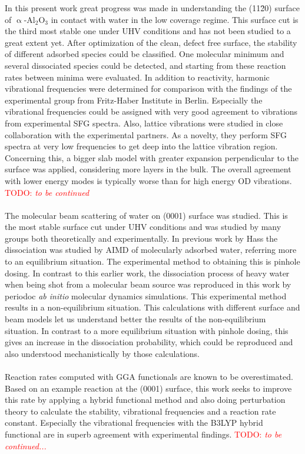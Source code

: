 \documentclass[11pt,DIV=13,BCOR=5mm,a4paper,headinclude]{scrbook}
\newcommand\todo[1]{\textcolor{red}{TODO: \textit{{#1}}}}
\begin{document}

In this present work great progress was made in understanding the (11\=20) surface of $\upalpha$-Al$_2$O$_3$ in contact with water in the low coverage regime.
This surface cut is the third most stable one under UHV conditions and has not been studied to a great extent yet.
After optimization of the clean, defect free surface, the stability of different adsorbed species could be classified.
One molecular minimum and several dissociated species could be detected, and starting from these reaction rates between minima were evaluated.
In addition to reactivity, harmonic vibrational frequencies were determined for comparison with the findings of the experimental group from Fritz-Haber Institute in Berlin.
Especially the vibrational frequencies could be assigned with very good agreement to vibrations from experimental SFG spectra.
Also, lattice vibrations were studied in close collaboration with the experimental partners.
As a novelty, they perform SFG spectra at very low frequencies to get deep into the lattice vibration region.
Concerning this, a bigger slab model with greater expansion perpendicular to the surface was applied, considering more layers in the bulk.
The overall agreement with lower energy modes is typically worse than for high energy OD vibrations.
\todo{to be continued}
\\\\
The molecular beam scattering of water on (0001) surface was studied.
This is the most stable surface cut under UHV conditions and was studied by many groups both theoretically and experimentally.
In previous work by Hass the dissociation was studied by AIMD of molecularly adsorbed water, referring more to an equilibrium situation.
The experimental method to obtaining this is pinhole dosing.
In contrast to this earlier work, the dissociation process of heavy water when being shot from a molecular beam source was reproduced in this work by periodoc \textit{ab initio} molecular dynamics simulations.
This experimental method results in a non-equilibrium situation.
This calculations with different surface and beam models let us understand better the results of the non-equilibrium situation.
In contrast to a more equilibrium situation with pinhole dosing, this gives an increase in the dissociation probability, which could be reproduced and also understood mechanistically by those calculations.
\\\\
Reaction rates computed with GGA functionals are known to be overestimated.
Based on an example reaction at the (0001) surface, this work seeks to improve this rate by applying a hybrid functional method and also doing perturbation theory to calculate the stability, vibrational frequencies and a reaction rate constant.
Especially the vibrational frequencies with the B3LYP hybrid functional are in superb agreement with experimental findings.
\todo{to be continued...}
\end{document}
